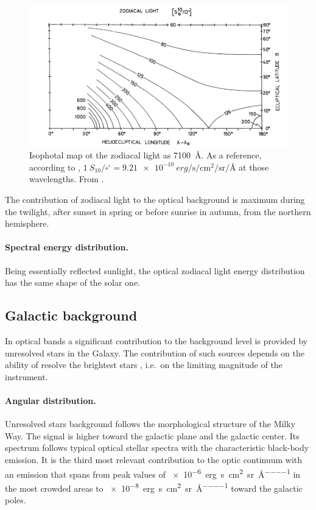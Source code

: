 \documentclass[a4paper, titlepage, 10pt]{book}
\begin{document}
\begin{figure}
	\centering
	\includegraphics[width=.8\textwidth]{zodiacal_distribution}
	\caption{Isophotal map ot the zodiacal light as \SI{7100}{\angstrom}. As a reference, according to \cite{leinert19981997}, $\SI{1}{S}_{10}/\square^\circ = \SI{9.21e-10}{erg\per\second \per\centi\metre\squared \per\steradian\per\angstrom}$ at those wavelengths. From \cite{frey1974photometry}.\label{fig:zodiacal_distribution}}
\end{figure}

The contribution of zodiacal light to the optical background is maximum during the twilight, after sunset in spring or before sunrise in autumn, from the northern hemisphere.

\paragraph{Spectral energy distribution.} Being essentially reflected sunlight, the optical zodiacal light energy distribution has the same shape of the solar one.

\subsection{Galactic background}
In optical bands a significant contribution to the background level is provided by unresolved stars in the Galaxy. The contribution of such sources depends on the ability of resolve the brightest stars \cite{leinert19981997}, i.e.\ on the limiting magnitude of the instrument.

\paragraph{Angular distribution.} Unresolved stars background follows the morphological structure of the Milky Way. The signal is higher toward the galactic plane and the galactic center.  Its spectrum follows typical optical stellar spectra with the characteristic black-body emission. It is the third most relevant contribution to the optic continuum with an emission that spans from peak values of \SI{e-6}{erg\per\second \per\centi\metre\squared \per\steradian\per\angstrom} in the most crowded areas to \SI{e-8}{erg\per\second \per\centi\metre\squared \per\steradian\per\angstrom} toward the galactic poles.
\end{document}
